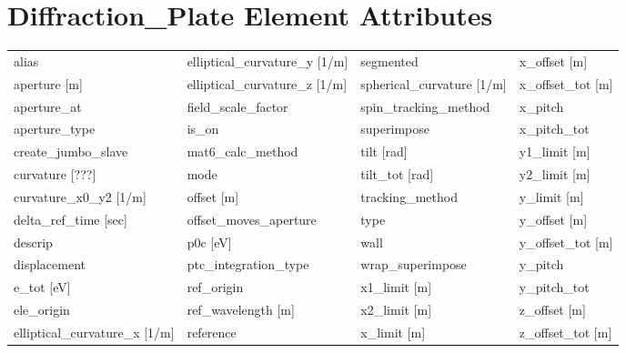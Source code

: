  \section{Diffraction_Plate Element Attributes}
 \label{s:list.diffraction.plate}
 
 \begin{tabular}{llll} \toprule
alias                            & elliptical_curvature_y [1/m]     & segmented                        & x_offset [m]                     \\
aperture [m]                     & elliptical_curvature_z [1/m]     & spherical_curvature [1/m]        & x_offset_tot [m]                 \\
aperture_at                      & field_scale_factor               & spin_tracking_method             & x_pitch                          \\
aperture_type                    & is_on                            & superimpose                      & x_pitch_tot                      \\
create_jumbo_slave               & mat6_calc_method                 & tilt [rad]                       & y1_limit [m]                     \\
curvature [???]                  & mode                             & tilt_tot [rad]                   & y2_limit [m]                     \\
curvature_x0_y2 [1/m]            & offset [m]                       & tracking_method                  & y_limit [m]                      \\
delta_ref_time [sec]             & offset_moves_aperture            & type                             & y_offset [m]                     \\
descrip                          & p0c [eV]                         & wall                             & y_offset_tot [m]                 \\
displacement                     & ptc_integration_type             & wrap_superimpose                 & y_pitch                          \\
e_tot [eV]                       & ref_origin                       & x1_limit [m]                     & y_pitch_tot                      \\
ele_origin                       & ref_wavelength [m]               & x2_limit [m]                     & z_offset [m]                     \\
elliptical_curvature_x [1/m]     & reference                        & x_limit [m]                      & z_offset_tot [m]                 \\
 \bottomrule
 \end{tabular}
 \vfill
 
